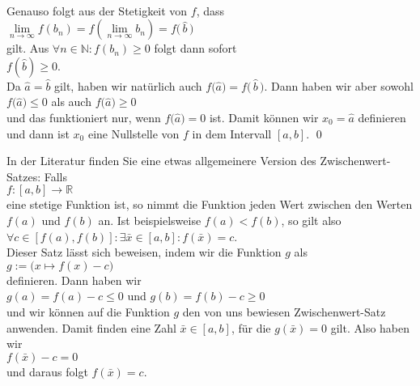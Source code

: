 \\[0.2cm]
Genauso folgt aus der Stetigkeit von $f$, dass
\\[0.2cm]
\hspace*{1.3cm}
$\lim\limits_{n\rightarrow\infty} f(b_n) = f\left(\lim\limits_{n\rightarrow\infty}
  b_n\right) = f\bigl(\,\widehat{b}\,\bigr)$ 
\\[0.3cm]
gilt.  Aus $\forall n\in\mathbb{N}: f(b_n) \geq 0$ folgt dann sofort
\\[0.2cm]
\hspace*{1.3cm}
$f(\widehat{b}) \geq 0$.
\\[0.2cm]
Da $\widehat{a} = \widehat{b}$ gilt, haben wir nat\"urlich auch 
$f\bigl(\widehat{a}\bigr) = f\bigl(\,\widehat{b}\,\bigr)$.  Dann haben wir aber sowohl
\\[0.2cm]
\hspace*{1.3cm}
$f\bigl(\widehat{a}\bigr) \leq 0$ \quad als auch \quad $f\bigl(\widehat{a}\bigr) \geq 0$ 
\\[0.2cm]
und das funktioniert nur, wenn $f\bigl(\widehat{a}\bigr) = 0$ ist.  Damit k\"onnen wir $x_0 =
\widehat{a}$ definieren und dann ist $x_0$ eine
Nullstelle von $f$ in dem Intervall $[a,b]$.
\qed

\remark
In der Literatur finden Sie eine etwas allgemeinere Version des Zwischenwert-Satzes: Falls
\\[0.2cm]
\hspace*{1.3cm}
$f:[a,b] \rightarrow \mathbb{R}$
\\[0.2cm]  
eine stetige Funktion ist, so nimmt die Funktion jeden Wert zwischen den Werten $f(a)$ und $f(b)$ an.
Ist beispielsweise $f(a) < f(b)$, so gilt also
\\[0.2cm]
\hspace*{1.3cm}
$\forall c \in [f(a), f(b)]: \exists \bar{x} \in [a,b]: f(\bar{x}) = c$.
\\[0.2cm]
Dieser Satz l\"asst sich beweisen, indem wir die Funktion $g$ als
\\[0.2cm]
\hspace*{1.3cm}
$g := \bigl(x \mapsto f(x) - c\bigr)$
\\[0.2cm]
definieren.  Dann haben wir
\\[0.2cm]
\hspace*{1.3cm}
$g(a) = f(a) - c \leq 0$ \quad und \quad $g(b) = f(b) - c \geq 0$
\\[0.2cm]
und wir k\"onnen auf die Funktion $g$ den von uns bewiesen Zwischenwert-Satz anwenden.  Damit finden
eine Zahl $\bar{x} \in [a,b]$, f\"ur die $g(\bar{x}) = 0$ gilt.  Also haben wir
\\[0.2cm]
\hspace*{1.3cm}
$f(\bar{x}) -c = 0$
\\[0.2cm]
und daraus folgt $f(\bar{x}) = c$.  \eox

